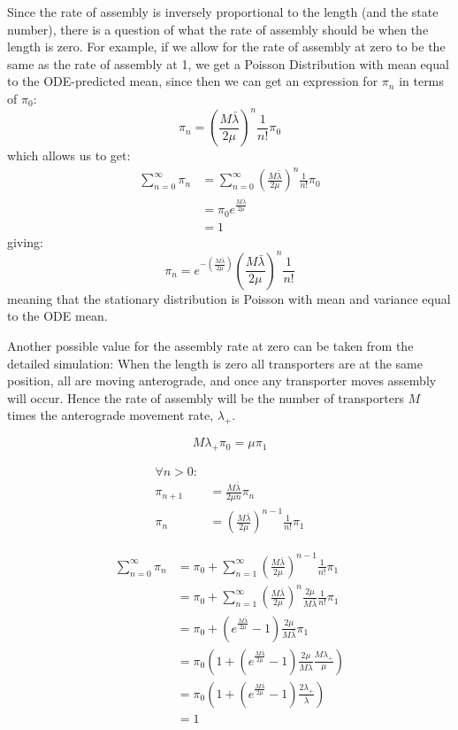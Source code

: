 \documentclass[titlepage]{article}
\begin{document}
Since the rate of assembly is inversely proportional to the length (and the state number), there is a question of what the rate of assembly should be when the length is zero. For example, if we allow for the rate of assembly at zero to be the same as the rate of assembly at 1, we get a Poisson Distribution with mean equal to the ODE-predicted mean, since then we can get an expression for $\pi_n$ in terms of $\pi_0$:
\begin{equation*}
 \pi_n = \left(\frac{M\bar\lambda}{2 \mu}\right)^n \frac{1}{n!} \pi_0
\end{equation*}
which allows us to get:
\begin{align*}
 \sum_{n=0}^\infty \pi_n
 &= \sum_{n=0}^\infty \left(\frac{M\bar\lambda}{2 \mu}\right)^n \frac{1}{n!} \pi_0 \\
 &= \pi_0 e^{\frac{M\bar\lambda}{2 \mu}} \\
 &= 1
\end{align*}
giving:
\begin{equation*}
 \pi_n = e^{-(\frac{M\bar\lambda}{2 \mu})} \left(\frac{M\bar\lambda}{2 \mu }\right)^n \frac{1}{n!}
\end{equation*}
meaning that the stationary distribution is Poisson with mean and variance equal to the ODE mean.

Another possible value for the assembly rate at zero can be taken from the detailed simulation: When the length is zero all transporters are at the same position, all are moving anterograde, and once any transporter moves assembly will occur. Hence the rate of assembly will be the number of transporters $M$ times the anterograde movement rate, $\lambda_+$.

\begin{equation*}
 M \lambda_+ \pi_0 = \mu \pi_1
\end{equation*}

\begin{align*}
 \forall n > 0: \\
 \pi_{n+1} &= \frac{M \bar\lambda}{2 \mu n} \pi_n \\
 \pi_n &= \left( \frac{M \bar\lambda}{2 \mu} \right)^{n-1} \frac{1}{n!} \pi_1
\end{align*}

\begin{align*}
 \sum_{n = 0}^\infty \pi_n
 &= \pi_0 + \sum_{n = 1}^\infty \left( \frac{M \bar\lambda}{2 \mu} \right)^{n-1} \frac{1}{n!} \pi_1 \\
 &= \pi_0 + \sum_{n = 1}^\infty \left( \frac{M \bar\lambda}{2 \mu} \right)^{n} \frac{2 \mu}{M \bar\lambda} \frac{1}{n!} \pi_1 \\
 &= \pi_0 + \left( e^\frac{M \bar\lambda}{2 \mu} - 1 \right) \frac{2 \mu}{M \bar\lambda} \pi_1 \\
 &= \pi_0 \left( 1 + \left( e^\frac{M \bar\lambda}{2 \mu} - 1 \right) \frac{2 \mu}{M \bar\lambda} \frac{M \lambda_+}{\mu} \right) \\
 &= \pi_0 \left( 1 + \left( e^\frac{M \bar\lambda}{2 \mu} - 1 \right) \frac{2 \lambda_+}{\bar\lambda} \right) \\
 &= 1
\end{align*}
\end{document}
